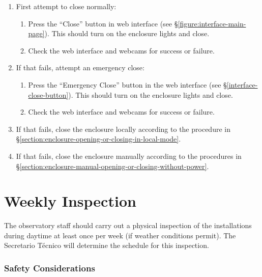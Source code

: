 \begin{enumerate}
\item
First attempt to close normally:
\begin{enumerate}
\item
Press the “Close” button in web interface (see \S\ref{figure:interface-main-page}). This should turn on the enclosure lights and close.
\item
Check the web interface and webcams for success or failure.
\end{enumerate}
\item
If that fails, attempt an emergency close:
\begin{enumerate}
\item
Press the “Emergency Close” button in the web interface (see \S\ref{interface-close-button}). This should turn on the enclosure lights and close.
\item
Check the web interface and webcams for success or failure.
\end{enumerate}
\item
If that fails, close the enclosure locally according to the procedure in \S\ref{section:enclosure-opening-or-closing-in-local-mode}.
\item
If that fails, close the enclosure manually according to the procedures in 
\S\ref{section:enclosure-manual-opening-or-closing-without-power}.
\end{enumerate}

\section{Weekly Inspection}

The observatory staff should carry out a physical inspection of the installations during daytime at least once per week (if weather conditions permit). The Secretario Técnico will determine the schedule for this inspection.

\subsubsection{Safety Considerations}



